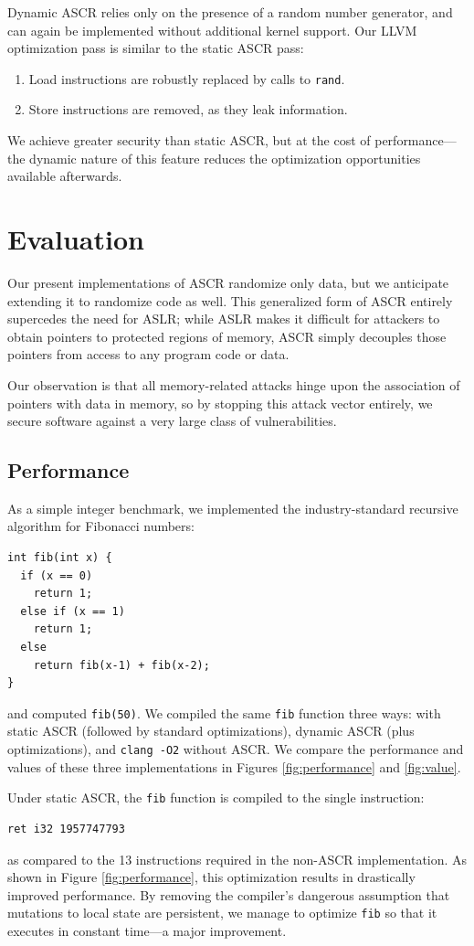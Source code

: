 \documentclass[10pt,twocolumn]{article}
\renewcommand{\t}{\texttt}
\begin{document}
Dynamic ASCR relies only on the presence of a random number generator, and can
again be implemented without additional kernel support. Our LLVM optimization
pass is similar to the static ASCR pass:
\begin{enumerate}
\item Load instructions are robustly replaced by calls to \t{rand}.
\item Store instructions are removed, as they leak information.
\end{enumerate}
We achieve greater security than static ASCR, but at the cost of
performance---the dynamic nature of this feature reduces the optimization
opportunities available afterwards.

\section{Evaluation}

Our present implementations of ASCR randomize only data, but we anticipate
extending it to randomize code as well. This generalized form of ASCR entirely
supercedes the need for ASLR; while ASLR makes it difficult for attackers to
obtain pointers to protected regions of memory, ASCR simply decouples those
pointers from access to any program code or data.

Our observation is that all memory-related attacks hinge upon the association of
pointers with data in memory, so by stopping this attack vector entirely, we
secure software against a very large class of vulnerabilities.

\subsection{Performance}

As a simple integer benchmark, we implemented the industry-standard
recursive algorithm \cite{Angiuli,Angiuli} for Fibonacci numbers:
\begin{verbatim}
int fib(int x) {
  if (x == 0)
    return 1;
  else if (x == 1)
    return 1;
  else
    return fib(x-1) + fib(x-2);
}
\end{verbatim}
and computed \t{fib(50)}. We compiled the same \t{fib} function three ways: with
static ASCR (followed by standard optimizations), dynamic ASCR (plus
optimizations), and \t{clang -O2} without ASCR. We compare the performance and
values of these three implementations in Figures \ref{fig:performance} and
\ref{fig:value}.

Under static ASCR, the \t{fib} function is compiled to the single instruction:
\begin{verbatim}
ret i32 1957747793
\end{verbatim}
as compared to the 13 instructions required in the non-ASCR implementation. As
shown in Figure \ref{fig:performance}, this optimization results in drastically
improved performance. By removing the compiler's dangerous assumption that
mutations to local state are persistent, we manage to optimize \t{fib} so that
it executes in constant time---a major improvement.
\end{document}
